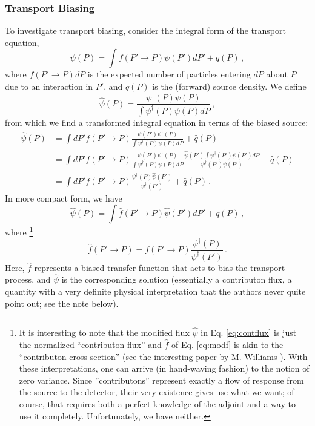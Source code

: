 \subsubsection{Transport Biasing}
 To investigate transport biasing, consider the integral form of the transport
equation,
\begin{equation}
 \psi(P) = \int f(P'\to P) \psi(P') dP' + q(P) \, ,
\end{equation}
where $f(P' \to P) dP$ is the expected number of particles entering $dP$ about
$P$ due to an interaction in $P'$, and $q(P)$ is the (forward) source density. 
We define
\begin{equation}
 \hat{\psi}(P) = \frac{ \psi^\dag(P)\psi(P) }{ \int \psi^\dag(P)\psi(P) dP } \,
,
 \label{eq:contflux}
\end{equation}
from which we find a transformed integral equation in terms of the biased
source:
{\footnotesize
\begin{equation}
\begin{split}
 \hat{\psi}(P) &= \int dP' f(P'\to P) \frac{ \psi(P')\psi^\dag(P) }{ \int
\psi^\dag(P)\psi(P) dP} + \hat{q}(P) \\
               &= \int dP' f(P'\to P) \frac{ \psi(P')\psi^\dag(P) }{ \int
\psi^\dag(P)\psi(P) dP}  \frac{ \hat{\psi}(P') \int \psi^\dag(P')\psi(P')
dP}{\psi^\dag(P')\psi(P') }+ \hat{q}(P) \\
               &= \int dP' f(P'\to P) \frac{ \psi^\dag(P) \hat{\psi}(P')
}{\psi^\dag(P') }+ \hat{q}(P) \, .
\end{split}
\label{eq:modeq}
\end{equation}
}
In more compact form, we have
\begin{equation}
  \hat{\psi}(P) = \int \hat{f}(P' \to P) \hat{\psi}(P') dP' + \hat{q}(P) \, ,
\end{equation}
where \footnote{It is interesting to note that the modified flux $\hat{\psi}$ in
Eq. \ref{eq:contflux} is just the normalized ``contributon flux'' and $\hat{f}$
of Eq. \ref{eq:modf} is akin to the ``contributon cross-section'' (see \eg the
interesting paper by M. Williams \cite{williams1991gcr}).  With these
interpretations, one can arrive (in hand-waving fashion) to the notion of zero
variance.  Since ''contributons'' represent exactly a flow of response from the
source to the detector, their very existence gives use what we want; of course,
that requires both a perfect knowledge of the adjoint and a way to use it
completely.  Unfortunately, we have neither.}
\begin{equation}
 \hat{f}(P' \to P) = f(P' \to P) \frac{\psi^\dag(P) }{\psi^\dag(P') } \, .
 \label{eq:modf}
\end{equation}
Here, $\hat{f}$ represents a biased transfer function that acts to bias the
transport process, and $\hat{\psi}$ is the corresponding solution (essentially a
contributon flux, a quantity with a very definite physical interpretation that
the authors never quite point out; see the note below).  

